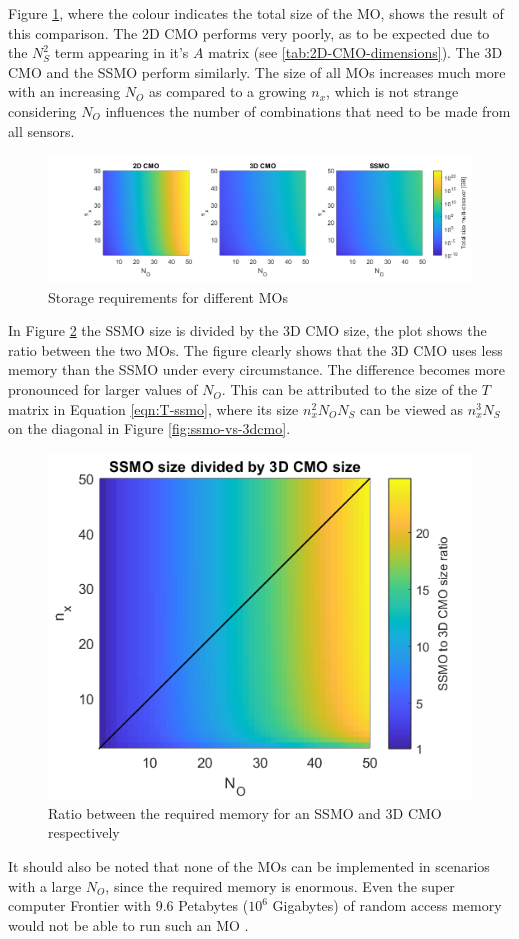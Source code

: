 Figure \ref{fig:MO-storage}, where the colour indicates the total size of the MO, shows the result of this comparison. The 2D CMO performs very poorly, as to be expected due to the $N_S^2$ term appearing in it's $A$ matrix (see \autoref{tab:2D-CMO-dimensions}). The 3D CMO and the SSMO perform similarly. The size of all MOs increases much more with an increasing $N_O$ as compared to a growing $n_x$, which is not strange considering $N_O$ influences the number of combinations that need to be made from all sensors.


\begin{figure}[H]
    \centering
    \includegraphics[width=\linewidth]{report/Figures/sizeComparison60.png}
    \caption{Storage requirements for different MOs}
    \label{fig:MO-storage}
\end{figure}


In Figure \ref{fig:ssmo-vs-3dcmo} the SSMO size is divided by the 3D CMO size, the plot shows the ratio between the two MOs. The figure clearly shows that the 3D CMO uses less memory than the SSMO under every circumstance. The difference becomes more pronounced for larger values of $N_O$. This can be attributed to the size of the $T$ matrix in Equation \ref{eqn:T-ssmo}, where its size $n_x^2N_ON_S$ can be viewed as $n_x^3N_S$ on the diagonal in Figure \eqref{fig:ssmo-vs-3dcmo}.

\begin{figure}[H]
    \centering
    \includegraphics[width=0.4\linewidth]{report/Figures/ssmo_vs_3dcmo.png}
    \caption{Ratio between the required memory for an SSMO and 3D CMO respectively}
    \label{fig:ssmo-vs-3dcmo}
\end{figure}

It should also be noted that none of the MOs can be implemented in scenarios with a large $N_O$, since the required memory is enormous. Even the super computer Frontier with 9.6 Petabytes ($10^6$ Gigabytes) of random access memory would not be able to run such an MO \cite{2024FrontierDocumentation}.